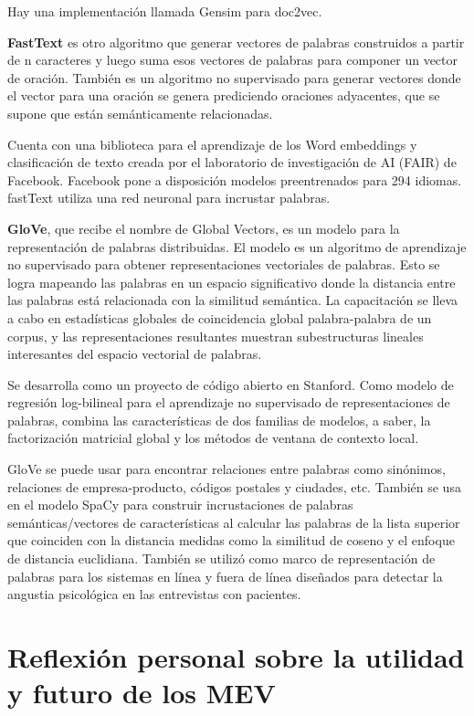 \documentclass[titlepage]{article}
\begin{document}
Hay una implementación llamada Gensim para doc2vec.

\textbf{FastText} es otro algoritmo que generar vectores de palabras construidos a partir de n caracteres y luego suma esos vectores de palabras para componer un vector de oración. También es un algoritmo no supervisado para generar vectores donde el vector para una oración se genera prediciendo oraciones adyacentes, que se supone que están semánticamente relacionadas.

Cuenta con una biblioteca para el aprendizaje de los Word embeddings y clasificación de texto creada por el laboratorio de investigación de AI (FAIR) de Facebook. Facebook pone a disposición modelos preentrenados para 294 idiomas. fastText utiliza una red neuronal para incrustar palabras.

\textbf{GloVe}, que recibe el nombre de Global Vectors, es un modelo para la representación de palabras distribuidas. El modelo es un algoritmo de aprendizaje no supervisado para obtener representaciones vectoriales de palabras. Esto se logra mapeando las palabras en un espacio significativo donde la distancia entre las palabras está relacionada con la similitud semántica. La capacitación se lleva a cabo en estadísticas globales de coincidencia global palabra-palabra de un corpus, y las representaciones resultantes muestran subestructuras lineales interesantes del espacio vectorial de palabras. 

Se desarrolla como un proyecto de código abierto en Stanford.  Como modelo de regresión log-bilineal para el aprendizaje no supervisado de representaciones de palabras, combina las características de dos familias de modelos, a saber, la factorización matricial global y los métodos de ventana de contexto local.

GloVe se puede usar para encontrar relaciones entre palabras como sinónimos, relaciones de empresa-producto, códigos postales y ciudades, etc. También se usa en el modelo SpaCy para construir incrustaciones de palabras semánticas/vectores de características al calcular las palabras de la lista superior que coinciden con la distancia medidas como la similitud de coseno y el enfoque de distancia euclidiana. También se utilizó como marco de representación de palabras para los sistemas en línea y fuera de línea diseñados para detectar la angustia psicológica en las entrevistas con pacientes. 

\section{Reflexión personal sobre la utilidad y futuro de los MEV}
\end{document}
